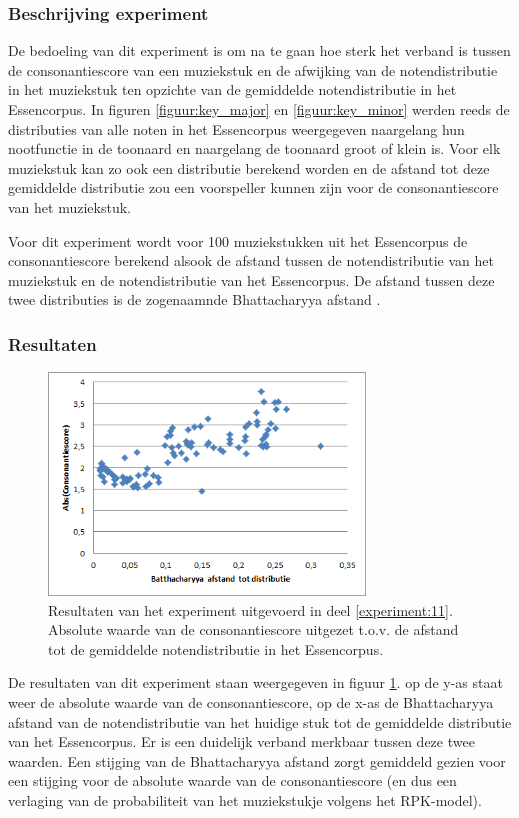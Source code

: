 \subsubsection{Beschrijving experiment}
De bedoeling van dit experiment is om na te gaan hoe sterk het verband is tussen de consonantiescore van een muziekstuk en de afwijking van de notendistributie in het muziekstuk ten opzichte van de gemiddelde notendistributie in het Essencorpus. In figuren \ref{figuur:key_major} en \ref{figuur:key_minor} werden reeds de distributies van alle noten in het Essencorpus weergegeven naargelang hun nootfunctie in de toonaard en naargelang de toonaard groot of klein is. Voor elk muziekstuk kan zo ook een distributie berekend worden en de afstand tot deze gemiddelde distributie zou een voorspeller kunnen zijn voor de consonantiescore van het muziekstuk. 

Voor dit experiment wordt voor 100 muziekstukken uit het Essencorpus de consonantiescore berekend alsook de afstand tussen de notendistributie van het muziekstuk en de notendistributie van het Essencorpus. De afstand tussen deze twee distributies is de zogenaamnde Bhattacharyya afstand \cite{book:bhattacharyya}. 

\subsubsection{Resultaten}
\begin{figure}[!ht]
  \centering
  \includegraphics[width=0.75\textwidth]{5_Experimenten_Resultaten/exp11_res}
  \caption{Resultaten van het experiment uitgevoerd in deel \ref{experiment:11}. Absolute waarde van de consonantiescore uitgezet t.o.v. de afstand tot de gemiddelde notendistributie in het Essencorpus.}
  \label{figuur:exp11}
\end{figure}

De resultaten van dit experiment staan weergegeven in figuur \ref{figuur:exp11}. op de y-as staat weer de absolute waarde van de consonantiescore, op de x-as de Bhattacharyya afstand van de notendistributie van het huidige stuk tot de gemiddelde distributie van het Essencorpus. Er is een duidelijk verband merkbaar tussen deze twee waarden. Een stijging van de Bhattacharyya afstand zorgt gemiddeld gezien voor een stijging voor de absolute waarde van de consonantiescore (en dus een verlaging van de probabiliteit van het muziekstukje volgens het RPK-model).

